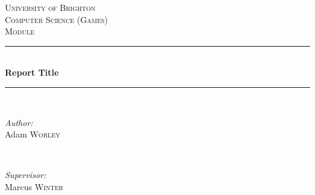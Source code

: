 \begin{titlepage}

\newcommand{\HRule}{\rule{\linewidth}{0.5mm}} %

\center %


\textsc{\LARGE University of Brighton}\\[1.5cm] %
\textsc{\Large Computer Science (Games)}\\[0.5cm] %
\textsc{\large Module }\\[0.5cm] %


\HRule \\[0.4cm]
{ \huge \bfseries Report Title}\\[0.4cm] %
\HRule \\[1.5cm]


\begin{minipage}{0.4\textwidth}
\begin{flushleft} \large
\emph{Author:}\\
Adam \textsc{Worley} %
\end{flushleft}
\end{minipage}
~
\begin{minipage}{0.4\textwidth}
\begin{flushright} \large
\emph{Supervisor:} \\
Marcus \textsc{Winter} %
\end{flushright}
\end{minipage}\\[3cm]



\end{titlepage}
